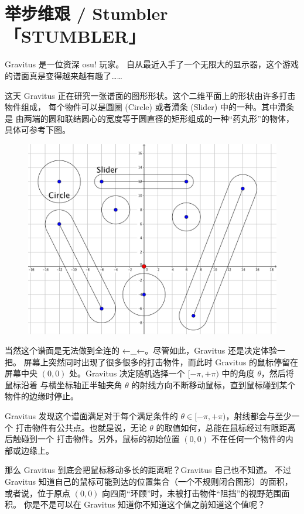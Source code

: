 \documentclass[UTF8, 11pt, a4paper]{article}
\begin{document}
\section*{举步维艰 / Stumbler \makebox[2.5em]{} \small{「STUMBLER」}}
Gravitus 是一位资深 osu! 玩家。%
自从最近入手了一个无限大的显示器，这个游戏的谱面真是变得越来越有趣了……

这天 Gravitus 正在研究一张谱面的图形形状。这个二维平面上的形状由许多打击物件组成，%
每个物件可以是圆圈 (Circle) 或者滑条 (Slider) 中的一种。其中滑条是%
由两端的圆和联结圆心的宽度等于圆直径的矩形组成的一种“药丸形”的物体，具体可参考下图。

\begin{figure}[h]\centering
\includegraphics[scale=0.22]{desc.png}
\end{figure}

当然这个谱面是无法做到全连的 ←\_←。尽管如此，Gravitus 还是决定体验一把。%
屏幕上突然同时出现了很多很多的打击物件，而此时 Gravitus 的鼠标停留在屏幕中央 $(0, 0)$ %
处。Gravitus 决定随机选择一个 $[-\pi, +\pi)$ 中的角度 $\theta$，然后将鼠标沿着%
与横坐标轴正半轴夹角 $\theta$ 的射线方向不断移动鼠标，直到鼠标碰到某个物件的边缘时停止。

Gravitus 发现这个谱面满足对于每个满足条件的 $\theta \in [-\pi, +\pi)$，射线都会与至少一个%
打击物件有公共点。也就是说，无论 $\theta$ 的取值如何，总能在鼠标经过有限距离后触碰到一个%
打击物件。另外，鼠标的初始位置 $(0, 0)$ 不在任何一个物件的内部或边缘上。

那么 Gravitus 到底会把鼠标移动多长的距离呢？Gravitus 自己也不知道。%
不过 Gravitus 知道自己的鼠标可能到达的位置集合（一个不规则闭合图形）的面积，%
或者说，位于原点 $(0, 0)$ 向四周“环顾”时，未被打击物件“阻挡”的视野范围面积。%
你是不是可以在 Gravitus 知道你不知道这个值之前知道这个值呢？
\end{document}
